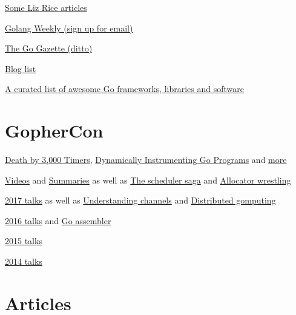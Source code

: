 \documentclass[12pt,notitlepage]{article}
\begin{document}
\href{https://medium.com/@lizrice}{Some Liz Rice articles}

\href{https://golangweekly.com}{Golang Weekly (sign up for email)}

\href{http://www.go-gazette.com}{The Go Gazette (ditto)}

\href{https://github.com/golang/go/wiki/Blogs}{Blog list}

\href{https://github.com/avelino/awesome-go}{A curated list of awesome Go frameworks, libraries and software}


\section{GopherCon}

\begin{description}[style=unboxed,leftmargin=1.2cm]
    \item[2019] \href{https://www.youtube.com/watch?v=h0s8CWpIKdg}{Death by 3,000 Timers}, 
                \href{https://www.youtube.com/watch?v=de9cVAx6REA}{Dynamically Instrumenting Go Programs} and
                \href{https://github.com/gophercon/2019-talks}{more}
    \item[2018] \href{https://tqdev.com/2018-gophercon-2018-videos-online}{Videos} and
                    \href{https://about.sourcegraph.com/go/}{Summaries} as well as 
                    \href{https://www.youtube.com/watch?v=YHRO5WQGh0k}{\color{red} The scheduler saga} and
                    \href{https://www.youtube.com/watch?v=M0HER1G5BRw}{Allocator wrestling}
    \item[2017] \href{https://github.com/gophercon/2017-talks}{2017 talks} as well as 
                    \href{https://www.youtube.com/watch?v=KBZlN0izeiY}{\color{red} Understanding channels} and
                    \href{https://www.youtube.com/watch?v=PXdao4VxQMQ}{Distributed gomputing}
    \item[2016] \href{https://github.com/gophercon/2016-talks}{2016 talks} and 
                     \href{https://www.youtube.com/watch?v=KINIAgRpkDA&list=PL2ntRZ1ySWBdliXelGAItjzTMxy2WQh0P}{Go assembler}
    \item[2015] \href{https://github.com/gophercon/2015-talks}{2015 talks}
    \item[2014] \href{https://github.com/gophercon/2014-talks}{2014 talks}
\end{description}


\section{Articles}
\end{document}
